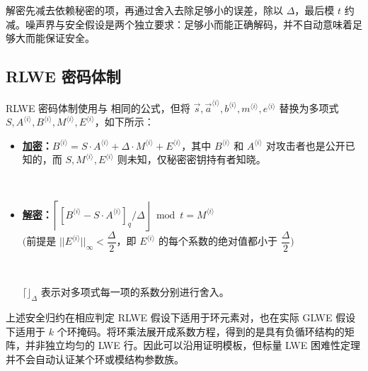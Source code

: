 解密先减去依赖秘密的项，再通过舍入去除足够小的误差，除以 $\Delta$，最后模 $t$ 约减。噪声界与安全假设是两个独立要求：足够小而能正确解码，并不自动意味着足够大而能保证安全。

\subsection{RLWE 密码体制}
\label{subsec:lattice-scheme2}

RLWE 密码体制使用与 \tboxlabel{\ref*{subsec:lattice-scheme}} 相同的公式，但将 $\vec{s}, \vec{a}^{\langle i \rangle}, b^{\langle i \rangle}, m^{\langle i \rangle}, e^{\langle i \rangle}$ 替换为多项式 $S, A^{\langle i \rangle}, B^{\langle i \rangle}, M^{\langle i \rangle}, E^{\langle i \rangle}$，如下所示：

\begin{tcolorbox}[title={\textbf{\tboxlabel{\ref*{subsec:lattice-scheme2}} 基于格的 RLWE 密码体制}}]
\begin{itemize}
    \item \textbf{\underline{加密}：}$B^{\langle i \rangle} = S \cdot A^{\langle i \rangle} + \Delta \cdot M^{\langle i \rangle} + E^{\langle i \rangle}$，其中 $B^{\langle i \rangle}$ 和 $A^{\langle i \rangle}$ 对攻击者也是公开已知的，而 $S, M^{\langle i \rangle}, E^{\langle i \rangle}$ 则未知，仅秘密密钥持有者知晓。

    $ $
    
    \item \textbf{\underline{解密}：}$\left\lceil [B^{\langle i\rangle}-S\cdot A^{\langle i\rangle}]_q/\Delta\right\rfloor\bmod t=M^{\langle i\rangle}$ \\$\Big($前提是 $||E^{\langle i \rangle}||_{\infty} < \dfrac{\Delta}{2}$，即 $E^{\langle i \rangle}$ 的每个系数的绝对值都小于 $\dfrac{\Delta}{2}\Big)$

    $ $

    $\lceil  \rfloor_{\Delta}$ 表示对多项式每一项的系数分别进行舍入。

\end{itemize}



\end{tcolorbox}

上述安全归约在相应判定 RLWE 假设下适用于环元素对，也在实际 GLWE 假设下适用于 $k$ 个环掩码。将环乘法展开成系数方程，得到的是具有负循环结构的矩阵，并非独立均匀的 LWE 行。因此可以沿用证明模板，但标量 LWE 困难性定理并不会自动认证某个环或模结构参数族。
